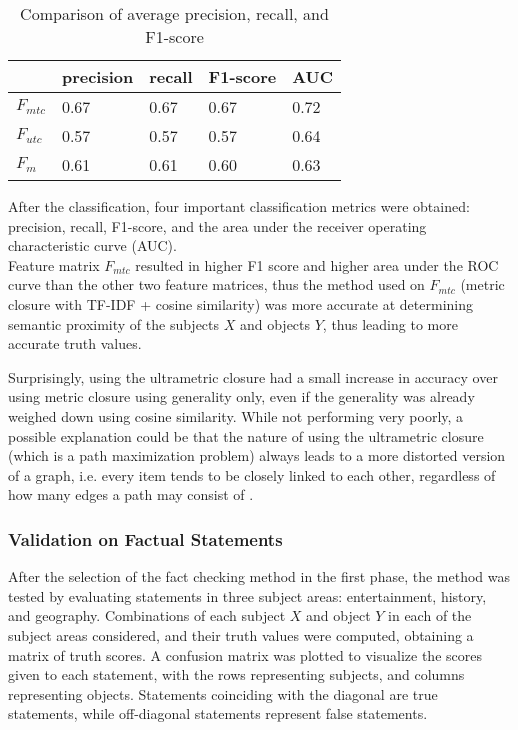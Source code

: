 \documentclass[10pt,11pt,12pt,oneside]{book}
\begin{document}
\begin{table}[H]
	\begin{tabular}{ | p{5cm} || p{2.25cm} | p{2.25cm} | p{2.25cm} | p{2.25cm} |}
		\hline
		& precision & recall & F1-score & AUC\\
		\hline
		$ F_{mtc} $ & 0.67 & 0.67 & 0.67 & 0.72\\
		\hline
		$ F_{utc} $ & 0.57 & 0.57 & 0.57 & 0.64\\  
		\hline
		$ F_{m} $  & 0.61 & 0.61 & 0.60 & 0.63\\
		\hline
	\end{tabular}
	\caption{Comparison of average precision, recall, and F1-score}
	\label{cr_mold}
\end{table}

After the classification, four important classification metrics were obtained: precision, recall, F1-score, and the area under the receiver operating characteristic curve (AUC).\\

Feature matrix $ F_{mtc} $ resulted in higher F1 score and higher area under the ROC curve than the other two feature matrices, thus the method used on $ F_{mtc} $ (metric closure with TF-IDF + cosine similarity) was more accurate at determining semantic proximity of the subjects $ X $ and objects $ Y $, thus leading to more accurate truth values.
	
Surprisingly, using the ultrametric closure had a small increase in accuracy over using metric closure using generality only, even if the generality was already weighed down using cosine similarity. While not performing very poorly, a possible explanation could be that the nature of using the ultrametric closure (which is a path maximization problem) always leads to a more distorted version of a graph, i.e. every item tends to be closely linked to each other, regardless of how many edges a path may consist of \cite{simas2015distance}.

\subsubsection{Validation on Factual Statements}

After the selection of the fact checking method in the first phase, the method was tested by evaluating statements in three subject areas: entertainment, history, and geography. Combinations of each subject $ X $ and object $ Y $ in each of the subject areas considered, and their truth values were computed, obtaining a matrix of truth scores. A confusion matrix was plotted to visualize the scores given to each statement, with the rows representing subjects, and columns representing objects. Statements coinciding with the diagonal are true statements, while off-diagonal statements represent false statements.\\
\end{document}
